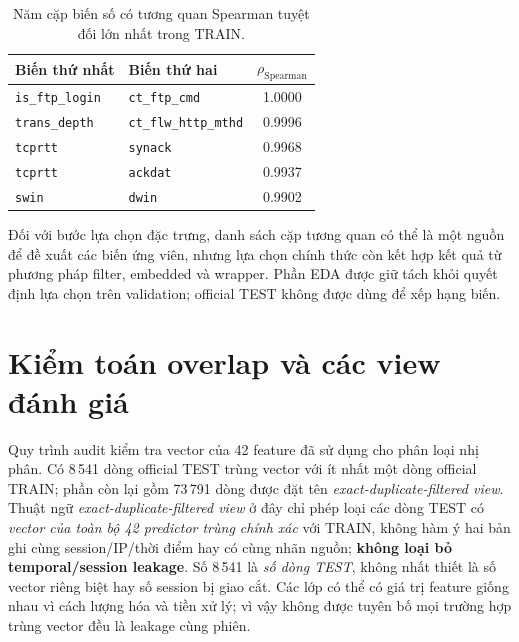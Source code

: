 \begin{table}[htbp]
\centering
\small
\renewcommand{\arraystretch}{1.25}
\setlength{\tabcolsep}{8pt}
\caption{Năm cặp biến số có tương quan Spearman tuyệt đối lớn nhất trong TRAIN.}
\label{tab:eda-high-correlation}
\begin{tabularx}{\linewidth}{X X S[table-format=1.4]}
\toprule
Biến thứ nhất & Biến thứ hai & {$\rho_{\mathrm{Spearman}}$}\\
\midrule
\texttt{is\_ftp\_login} & \texttt{ct\_ftp\_cmd} & 1.0000\\
\texttt{trans\_depth} & \texttt{ct\_flw\_http\_mthd} & 0.9996\\
\texttt{tcprtt} & \texttt{synack} & 0.9968\\
\texttt{tcprtt} & \texttt{ackdat} & 0.9937\\
\texttt{swin} & \texttt{dwin} & 0.9902\\
\bottomrule
\end{tabularx}
\end{table}

Đối với bước lựa chọn đặc trưng, danh sách cặp tương quan có thể là một nguồn để đề xuất các biến ứng viên, nhưng lựa chọn chính thức còn kết hợp kết quả từ phương pháp filter, embedded và wrapper. Phần EDA được giữ tách khỏi quyết định lựa chọn trên validation; official TEST không được dùng để xếp hạng biến.

\section{Kiểm toán overlap và các view đánh giá}
Quy trình audit kiểm tra vector của 42 feature đã sử dụng cho phân loại nhị phân. Có 8\,541 dòng official TEST trùng vector với ít nhất một dòng official TRAIN; phần còn lại gồm 73\,791 dòng được đặt tên \emph{exact-duplicate-filtered view}. Thuật ngữ \emph{exact-duplicate-filtered view} ở đây chỉ phép loại các dòng TEST có \emph{vector của toàn bộ 42 predictor trùng chính xác} với TRAIN, không hàm ý hai bản ghi cùng session/IP/thời điểm hay có cùng nhãn nguồn; \textbf{không loại bỏ temporal/session leakage}. Số 8\,541 là \emph{số dòng TEST}, không nhất thiết là số vector riêng biệt hay số session bị giao cắt. Các lớp có thể có giá trị feature giống nhau vì cách lượng hóa và tiền xử lý; vì vậy không được tuyên bố mọi trường hợp trùng vector đều là leakage cùng phiên.

